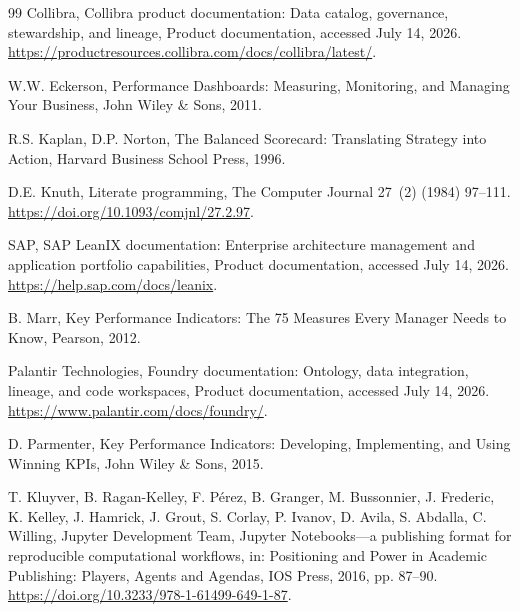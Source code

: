 \documentclass[a4paper,fleqn]{cas-dc}
\begin{document}
\begin{thebibliography}{99}
Collibra,
\newblock Collibra product documentation: Data catalog, governance, stewardship, and lineage,
\newblock Product documentation, accessed July 14, 2026.
\newblock \url{https://productresources.collibra.com/docs/collibra/latest/}.

W.W. Eckerson,
\newblock Performance Dashboards: Measuring, Monitoring, and Managing Your Business,
\newblock John Wiley \& Sons, 2011.

R.S. Kaplan, D.P. Norton,
\newblock The Balanced Scorecard: Translating Strategy into Action,
\newblock Harvard Business School Press, 1996.

D.E. Knuth,
\newblock Literate programming,
\newblock The Computer Journal 27~(2) (1984) 97--111.
\newblock \url{https://doi.org/10.1093/comjnl/27.2.97}.

SAP,
\newblock SAP LeanIX documentation: Enterprise architecture management and application portfolio capabilities,
\newblock Product documentation, accessed July 14, 2026.
\newblock \url{https://help.sap.com/docs/leanix}.

B. Marr,
\newblock Key Performance Indicators: The 75 Measures Every Manager Needs to Know,
\newblock Pearson, 2012.

Palantir Technologies,
\newblock Foundry documentation: Ontology, data integration, lineage, and code workspaces,
\newblock Product documentation, accessed July 14, 2026.
\newblock \url{https://www.palantir.com/docs/foundry/}.

D. Parmenter,
\newblock Key Performance Indicators: Developing, Implementing, and Using Winning KPIs,
\newblock John Wiley \& Sons, 2015.

T. Kluyver, B. Ragan-Kelley, F. P\'erez, B. Granger, M. Bussonnier, J. Frederic, K. Kelley, J. Hamrick, J. Grout, S. Corlay, P. Ivanov, D. Avila, S. Abdalla, C. Willing, Jupyter Development Team,
\newblock Jupyter Notebooks---a publishing format for reproducible computational workflows,
\newblock in: Positioning and Power in Academic Publishing: Players, Agents and Agendas, IOS Press, 2016, pp. 87--90.
\newblock \url{https://doi.org/10.3233/978-1-61499-649-1-87}.


\end{thebibliography}
\end{document}
